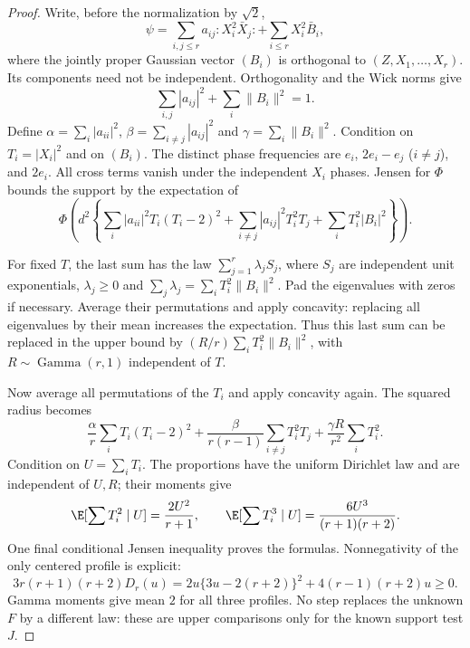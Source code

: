 \begin{proof}
Write, before the normalization by $\sqrt2$,
\[
 \psi=\sum_{i,j\le r}a_{ij}{:}X_i^2\bar X_j{:}
           +\sum_{i\le r}X_i^2\bar B_i,
\]
where the jointly proper Gaussian vector $(B_i)$ is orthogonal to
$(Z,X_1,\ldots,X_r)$. Its components need not be independent.
Orthogonality and the Wick norms give
\[
 \sum_{i,j}|a_{ij}|^2+\sum_i\|B_i\|^2=1.
\]
Define $\alpha=\sum_i|a_{ii}|^2$, $\beta=\sum_{i\ne j}|a_{ij}|^2$
and $\gamma=\sum_i\|B_i\|^2$.
Condition on $T_i=|X_i|^2$ and on $(B_i)$. The distinct phase
frequencies are $e_i$, $2e_i-e_j$ ($i\ne j$), and $2e_i$.
All cross terms vanish under the independent $X_i$ phases.
Jensen for $\Phi$ bounds the support by the expectation of
\[
 \Phi\!\left(d^2\left\{
 \sum_i|a_{ii}|^2T_i(T_i-2)^2
 +\sum_{i\ne j}|a_{ij}|^2T_i^2T_j
 +\sum_i T_i^2|B_i|^2\right\}\right).
\]

For fixed $T$, the last sum has the law
$\sum_{j=1}^r\lambda_j S_j$, where $S_j$ are independent unit
exponentials, $\lambda_j\ge0$ and
$\sum_j\lambda_j=\sum_iT_i^2\|B_i\|^2$.
Pad the eigenvalues with zeros if necessary. Average their
permutations and apply concavity: replacing all eigenvalues by their
mean increases the expectation. Thus this last sum can be replaced
in the upper bound by
$(R/r)\sum_iT_i^2\|B_i\|^2$, with $R\sim\operatorname{Gamma}(r,1)$
independent of $T$.

Now average all permutations of the $T_i$ and apply concavity again.
The squared radius becomes
\[
 \frac\alpha r\sum_iT_i(T_i-2)^2
 +\frac\beta{r(r-1)}\sum_{i\ne j}T_i^2T_j
 +\frac{\gamma R}{r^2}\sum_iT_i^2.
\]
Condition on $U=\sum_iT_i$. The proportions have the uniform
Dirichlet law and are independent of $U,R$; their moments give
\[
 \E[\sum T_i^2\mid U]=\frac{2U^2}{r+1},\qquad
 \E[\sum T_i^3\mid U]=\frac{6U^3}{(r+1)(r+2)}.
\]
One final conditional Jensen inequality proves the formulas.
Nonnegativity of the only centered profile is explicit:
\[
 3r(r+1)(r+2)D_r(u)
 =2u\{3u-2(r+2)\}^2+4(r-1)(r+2)u\ge0.
\]
Gamma moments give mean $2$ for all three profiles.
No step replaces the unknown $F$ by a different law: these are
upper comparisons only for the known support test $J$.
\end{proof}

